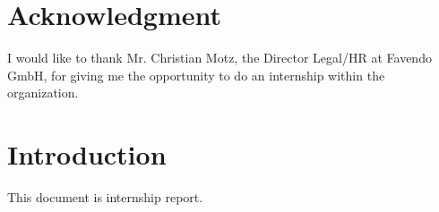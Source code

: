\section{Acknowledgment}
I would like to thank Mr. Christian Motz, the Director Legal/HR at Favendo GmbH, for giving me the opportunity to do an internship within the organization.

\section{Introduction}
This document is internship report.



